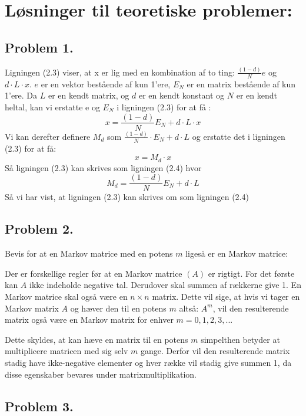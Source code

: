 
\section{Løsninger til teoretiske problemer:}


\subsection{Problem 1.} \label{problem 1}

Ligningen (2.3) viser, at x er lig med en kombination af to ting: $\frac{(1-d)}{N}e$ og $d\cdot L\cdot x$. $e$ er en vektor bestående af kun 1'ere, $E_N$ er en matrix bestående af kun 1'ere.
Da $L$ er en kendt matrix, og $d$ er en kendt konstant og $N$ er en kendt heltal, kan vi erstatte e og $E_N$ i ligningen (2.3) for at få :
$$x = \frac{(1-d)}{N}E_N + d\cdot L\cdot x$$
Vi kan derefter definere $M_d$ som $\frac{(1-d)}{N} \cdot E_N + d \cdot L$ og erstatte det i ligningen (2.3) for at få:
$$x = M_d \cdot x$$
Så ligningen (2.3) kan skrives som ligningen (2.4) hvor $$M_d = \frac{(1-d)}{N}E_N + d \cdot L$$
Så vi har vist, at ligningen (2.3) kan skrives om som ligningen (2.4)



\subsection{Problem 2.}

Bevis for at en Markov matrice med en potens $m$ ligeså er en Markov matrice:

Der er forskellige regler før at en Markov matrice $(A)$ er rigtigt. For det første kan $A$ ikke indeholde negative tal. Derudover skal summen af rækkerne give 1. En Markov matrice skal også være en $n \times n$ matrix. Dette vil sige, at hvis vi tager en Markov matrix $A$ og hæver den til en potens $m$ altså: $A^m$, vil den resulterende matrix også være en Markov matrix for enhver $m = 0,1,2,3,...$

Dette skyldes, at kan hæve en matrix til en potens $m$ simpelthen betyder at multiplicere matricen med sig selv $m$ gange. Derfor vil den resulterende matrix stadig have ikke-negative elementer og hver række vil stadig give summen 1, da disse egenskaber bevares under matrixmultiplikation.

\subsection{Problem 3.}

